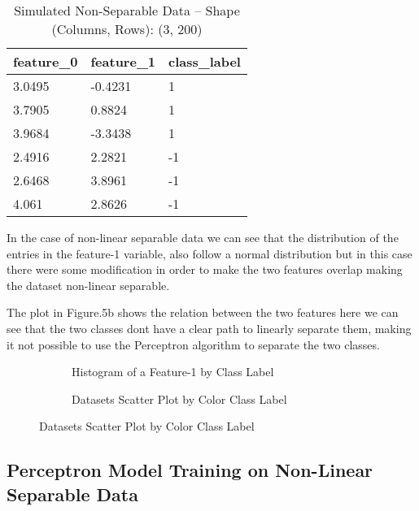 \documentclass[12pt]{article} %
\begin{document}
\begin{table}[ht]
\centering
\caption{Simulated Non-Separable Data  -- Shape (Columns, Rows): (3, 200)}
\begin{tabular}{@{}lll@{}}
\toprule
\textbf{feature\_0} & \textbf{feature\_1} & \textbf{class\_label} \\ \midrule
3.0495	&	-0.4231	&	1	\\
3.7905	&	0.8824	&	1	\\
3.9684	&	-3.3438	&	1	\\
2.4916	&	2.2821	&	-1	\\
2.6468	&	3.8961	&	-1	\\
4.061	&	2.8626	&	-1	\\ \bottomrule
\end{tabular}
\end{table}

In the case of non-linear separable data we can see that the distribution of the entries in the feature-1 variable, also follow a normal distribution but in this case there were some modification in order to make the two features overlap making the dataset non-linear separable. 


The plot in Figure.5b shows the relation between the two features here we can see that the two classes dont have a clear path to linearly separate them, making it not possible to use the Perceptron algorithm to separate the two classes.

\begin{figure}[ht]
\caption{Non-Linearly Separable Dataset Plots}\label{fig:nonlinear01}
\hspace*{-1.9cm}
    \begin{subfigure}[b]{0.6\textwidth}
        \caption{Histogram of a Feature-1 by Class Label }
        \label{fig:output_6}
    \end{subfigure}
    \begin{subfigure}[b]{0.6\textwidth}
        \caption{Datasets Scatter Plot by Color Class Label}
        \label{fig:output_7}
    \end{subfigure}
\end{figure}

\newpage

\subsection{Perceptron Model Training on Non-Linear Separable Data}
\end{document}

